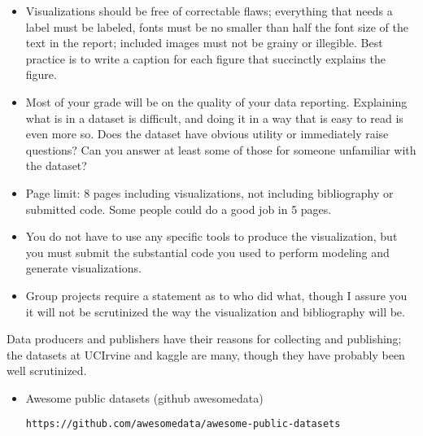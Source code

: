 \documentclass[]{book}
\theoremstyle{definition}
\begin{document}
\begin{enumerate}
\begin{itemize}
\item Visualizations should be free of correctable flaws; everything that needs a label must be labeled, fonts must be no smaller than half the font size of the text in the report; included images must not be grainy or illegible.  Best practice is to write a caption for each figure that succinctly explains the figure.

\item Most of your grade will be on the quality of your data reporting. Explaining what is in a dataset is difficult, and doing it in a way that is easy to read is even more so.  Does the dataset have obvious utility or immediately raise questions?  Can you answer at least some of those for someone unfamiliar with the dataset?

\item Page limit: 8 pages including visualizations, not including bibliography or submitted code.  Some people could do a good job in 5 pages.

\item You do not have to use any specific tools to produce the visualization, but you must submit the substantial code you used to perform modeling and generate visualizations.  

\item Group projects require a statement as to who did what, though I assure you it will not be scrutinized the way the visualization and bibliography will be.  
\end{itemize}

Data producers and publishers have their reasons for collecting and publishing; the datasets at UCIrvine and kaggle are many, though they have probably been well scrutinized.

\begin{itemize}

\item  Awesome public datasets (github awesomedata)

\texttt{https://github.com/awesomedata/awesome-public-datasets}



\end{itemize}
\end{enumerate}
\end{document}
